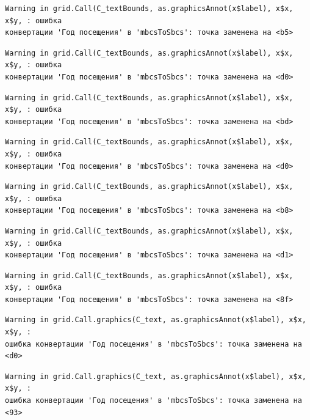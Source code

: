 \documentclass[
  letterpaper,
  DIV=11,
  numbers=noendperiod]{scrreprt}
\begin{document}
\begin{verbatim}
Warning in grid.Call(C_textBounds, as.graphicsAnnot(x$label), x$x, x$y, : ошибка
конвертации 'Год посещения' в 'mbcsToSbcs': точка заменена на <b5>
\end{verbatim}

\begin{verbatim}
Warning in grid.Call(C_textBounds, as.graphicsAnnot(x$label), x$x, x$y, : ошибка
конвертации 'Год посещения' в 'mbcsToSbcs': точка заменена на <d0>
\end{verbatim}

\begin{verbatim}
Warning in grid.Call(C_textBounds, as.graphicsAnnot(x$label), x$x, x$y, : ошибка
конвертации 'Год посещения' в 'mbcsToSbcs': точка заменена на <bd>
\end{verbatim}

\begin{verbatim}
Warning in grid.Call(C_textBounds, as.graphicsAnnot(x$label), x$x, x$y, : ошибка
конвертации 'Год посещения' в 'mbcsToSbcs': точка заменена на <d0>
\end{verbatim}

\begin{verbatim}
Warning in grid.Call(C_textBounds, as.graphicsAnnot(x$label), x$x, x$y, : ошибка
конвертации 'Год посещения' в 'mbcsToSbcs': точка заменена на <b8>
\end{verbatim}

\begin{verbatim}
Warning in grid.Call(C_textBounds, as.graphicsAnnot(x$label), x$x, x$y, : ошибка
конвертации 'Год посещения' в 'mbcsToSbcs': точка заменена на <d1>
\end{verbatim}

\begin{verbatim}
Warning in grid.Call(C_textBounds, as.graphicsAnnot(x$label), x$x, x$y, : ошибка
конвертации 'Год посещения' в 'mbcsToSbcs': точка заменена на <8f>
\end{verbatim}

\begin{verbatim}
Warning in grid.Call.graphics(C_text, as.graphicsAnnot(x$label), x$x, x$y, :
ошибка конвертации 'Год посещения' в 'mbcsToSbcs': точка заменена на <d0>
\end{verbatim}

\begin{verbatim}
Warning in grid.Call.graphics(C_text, as.graphicsAnnot(x$label), x$x, x$y, :
ошибка конвертации 'Год посещения' в 'mbcsToSbcs': точка заменена на <93>
\end{verbatim}
\end{document}
